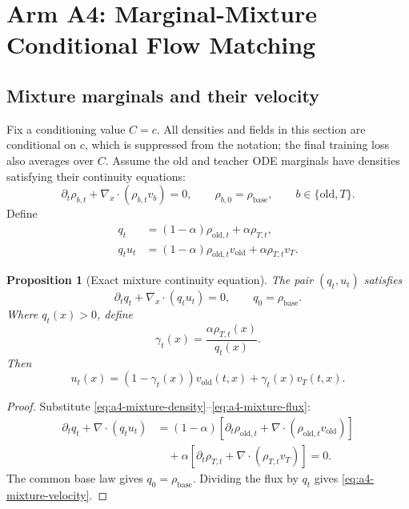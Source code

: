 \documentclass[11pt,a4paper]{article}
\newcommand{\vold}{v_{\mathrm{old}}}
\newcommand{\vT}{v_T}
\theoremstyle{plain}
\newtheorem{proposition}[theorem]{Proposition}
\theoremstyle{definition}
\begin{document}
\section{Arm A4: Marginal-Mixture Conditional Flow Matching}
\label{sec:a4}

\subsection{Mixture marginals and their velocity}

Fix a conditioning value $C=c$.  All densities and fields in this section are conditional on
$c$, which is suppressed from the notation; the final training loss also averages over $C$.
Assume the old and teacher ODE marginals have densities satisfying their continuity equations:
\begin{equation}
\partial_t\rho_{b,t}
+\nabla_x\!\cdot(\rho_{b,t}v_b)=0,
\qquad
\rho_{b,0}=\rho_{\mathrm{base}},
\qquad
b\in\{\mathrm{old},T\}.
\label{eq:a4-source-continuity}
\end{equation}
Define
\begin{align}
q_t
&=(1-\alpha)\rho_{\mathrm{old},t}+\alpha\rho_{T,t},
\label{eq:a4-mixture-density}\\
q_tu_t
&=(1-\alpha)\rho_{\mathrm{old},t}\vold
  +\alpha\rho_{T,t}\vT .
\label{eq:a4-mixture-flux}
\end{align}

\begin{proposition}[Exact mixture continuity equation]
\label{prop:a4-continuity}
The pair $(q_t,u_t)$ satisfies
\begin{equation}
\partial_tq_t+\nabla_x\!\cdot(q_tu_t)=0,
\qquad
q_0=\rho_{\mathrm{base}}.
\label{eq:a4-continuity}
\end{equation}
Where $q_t(x)>0$, define
\begin{equation}
\gamma_t(x)
=
\frac{\alpha\rho_{T,t}(x)}{q_t(x)}.
\label{eq:a4-marginal-responsibility}
\end{equation}
Then
\begin{equation}
u_t(x)
=(1-\gamma_t(x))\vold(t,x)
+\gamma_t(x)\vT(t,x).
\label{eq:a4-mixture-velocity}
\end{equation}
\end{proposition}

\begin{proof}
Substitute \eqref{eq:a4-mixture-density}--\eqref{eq:a4-mixture-flux}:
\begin{align*}
\partial_tq_t+\nabla\!\cdot(q_tu_t)
&=(1-\alpha)
  [\partial_t\rho_{\mathrm{old},t}
   +\nabla\!\cdot(\rho_{\mathrm{old},t}\vold)]\\
&\quad
  +\alpha
  [\partial_t\rho_{T,t}
   +\nabla\!\cdot(\rho_{T,t}\vT)]
=0.
\end{align*}
The common base law gives $q_0=\rho_{\mathrm{base}}$.  Dividing the flux by $q_t$ gives
\eqref{eq:a4-mixture-velocity}.
\end{proof}
\end{document}
